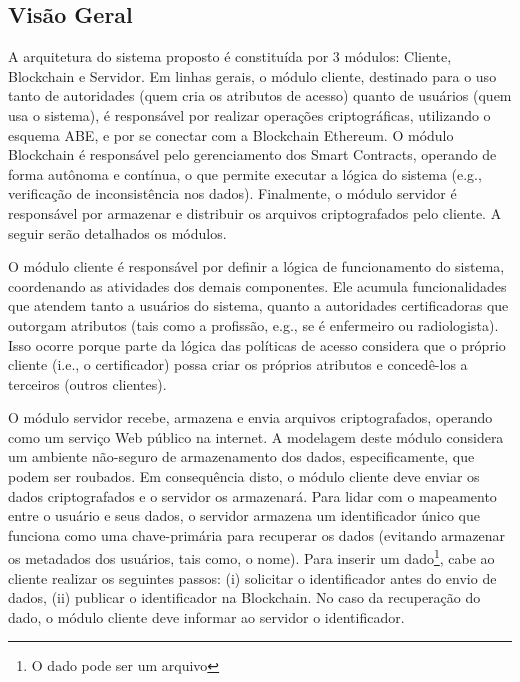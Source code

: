 \documentclass[a4paper,11pt]{article}
\begin{document}
\subsection{Visão Geral}
\label{sec:sub:visaogeral}


A arquitetura do sistema proposto é constituída por 3 módulos: Cliente, Blockchain e Servidor.  Em linhas gerais, o módulo cliente, %
destinado para o uso tanto de autoridades (quem cria os atributos de acesso) quanto de usuários (quem usa o sistema), é responsável por %
realizar operações criptográficas, utilizando o esquema ABE, e por se conectar com a Blockchain Ethereum.
O módulo Blockchain é responsável pelo gerenciamento dos Smart Contracts, operando de forma autônoma e contínua, o que permite executar a lógica do sistema (e.g., verificação de inconsistência nos dados).
Finalmente, o módulo servidor é responsável por armazenar e distribuir os arquivos criptografados pelo cliente.
A seguir serão detalhados os módulos.


O módulo cliente é responsável por definir a lógica de funcionamento do sistema, coordenando as atividades dos demais componentes.
Ele acumula funcionalidades que atendem tanto a usuários do sistema, quanto a autoridades certificadoras que outorgam atributos (tais como a profissão, e.g., se é enfermeiro ou radiologista).
Isso ocorre porque parte da lógica das políticas de acesso considera que o próprio cliente (i.e., o certificador) possa criar os próprios atributos e concedê-los a terceiros (outros clientes).

O módulo servidor recebe, armazena e envia arquivos criptografados, operando como um serviço Web público na internet.
A modelagem deste módulo considera um ambiente não-seguro de armazenamento dos dados, especificamente, que podem ser roubados.
Em consequência disto, o módulo cliente deve enviar os dados criptografados e o servidor os armazenará.
Para lidar com o mapeamento entre o usuário e seus dados, o servidor armazena um identificador único que funciona como uma chave-primária para recuperar os dados (evitando armazenar os metadados dos usuários, tais como, o nome).
Para inserir um dado\footnote{O dado pode ser um arquivo}, cabe ao cliente realizar os seguintes passos:
(i) solicitar o identificador antes do envio de dados,
(ii) publicar o identificador na Blockchain. No caso da recuperação do dado, o módulo cliente deve informar ao servidor o identificador.
\end{document}
